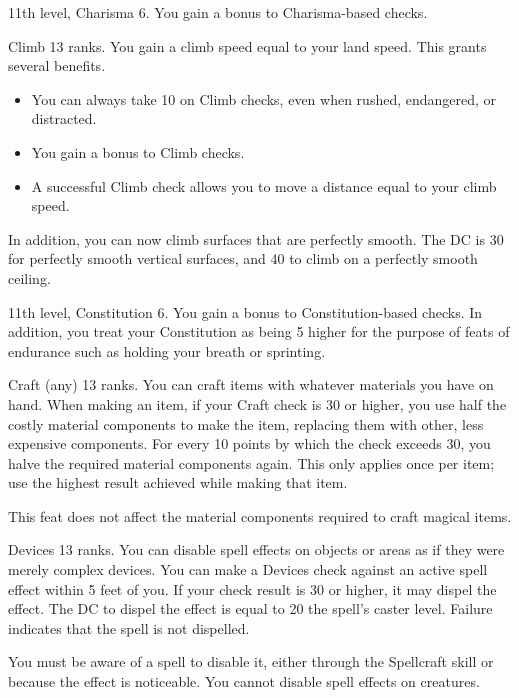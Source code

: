\featpre 11th level, Charisma 6.
\featben You gain a  bonus to Charisma-based checks.

\featpre Climb 13 ranks.
\featben You gain a climb speed equal to your land speed. This grants several benefits.
\begin{itemize}
    \item You can always take 10 on Climb checks, even when rushed, endangered, or distracted.
    \item You gain a  bonus to Climb checks.
    \item A successful Climb check allows you to move a distance equal to your climb speed.
\end{itemize}

In addition, you can now climb surfaces that are perfectly smooth. The DC is 30 for perfectly smooth vertical surfaces, and 40 to climb on a perfectly smooth ceiling.

\featpre 11th level, Constitution 6.
\featben You gain a  bonus to Constitution-based checks. In addition, you treat your Constitution as being 5 higher for the purpose of feats of endurance such as holding your breath or sprinting.

\featpre Craft (any) 13 ranks.
\featben You can craft items with whatever materials you have on hand. When making an item, if your Craft check is 30 or higher, you use half the costly material components to make the item, replacing them with other, less expensive components. For every 10 points by which the check exceeds 30, you halve the required material components again. This only applies once per item; use the highest result achieved while making that item.

This feat does not affect the material components required to craft magical items.

\featpre Devices 13 ranks.
\featben You can disable spell effects on objects or areas as if they were merely complex devices. You can make a Devices check against an active spell effect within 5 feet of you. If your check result is 30 or higher, it may dispel the effect. The DC to dispel the effect is equal to 20 \add the spell's caster level. Failure indicates that the spell is not dispelled.

You must be aware of a spell to disable it, either through the Spellcraft skill or because the effect is noticeable. You cannot disable spell effects on creatures.

